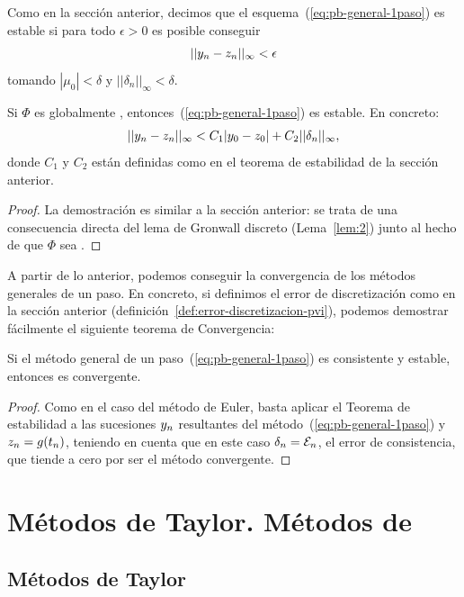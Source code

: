 Como en la sección anterior, decimos que el esquema~(\ref{eq:pb-general-1paso})
es estable si para todo $\epsilon>0$ es posible conseguir
$$
||{y_n} - z_n||_\infty < \epsilon
$$
tomando $|\mu_0|<\delta$ y $||\delta_n||_\infty<\delta$.

\begin{theorem}
  Si $\Phi$ es globalmente \lipschitz,
  entonces~(\ref{eq:pb-general-1paso}) es estable. En concreto:
  $$
  ||{y_n} - z_n||_\infty < C_1|y_0-z_0| + C_2 ||\delta_n||_\infty,
  $$
  donde $C_1$ y $C_2$ están definidas como en el teorema de
  estabilidad de la sección anterior.
\end{theorem}
\begin{proof}
  La demostración es similar a la sección anterior: se trata de una
  consecuencia directa del lema de Gronwall discreto
  (Lema~\ref{lem:2}) junto al hecho de que $\Phi$ sea \lipschitz.
\end{proof}
A partir de lo anterior, podemos conseguir la convergencia de los
métodos generales de un paso. En concreto, si definimos el error de
discretización como en la sección anterior
(definición~\ref{def:error-discretizacion-pvi}), podemos demostrar
fácilmente el siguiente teorema de Convergencia:

\begin{theorem}
  Si el método general de un paso~(\ref{eq:pb-general-1paso}) es
  consistente y estable, entonces es convergente.
\end{theorem}

\begin{proof}
  Como en el caso del método de Euler, basta aplicar el Teorema de
  estabilidad a las sucesiones ${y_n}$ resultantes del
  método~(\ref{eq:pb-general-1paso}) y $z_n=g({t_n})$, teniendo en
  cuenta que en este caso $\delta_n={\cal E}_n$, el error de
  consistencia, que tiende a cero por ser el método convergente.
\end{proof}

\section{Métodos de Taylor. Métodos de \RK}

\subsection*{Métodos de Taylor}
\label{sec:metodos-de-taylor}

